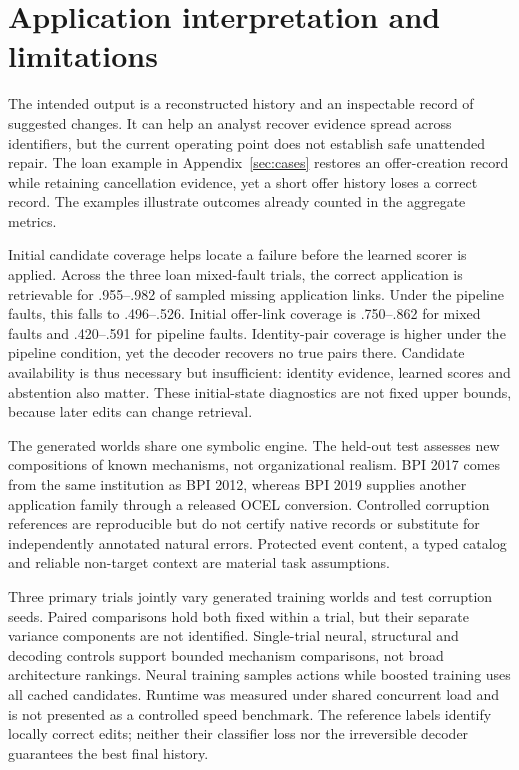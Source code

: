 \documentclass[11pt]{article}
\begin{document}
\section{Application interpretation and limitations}
The intended output is a reconstructed history and an inspectable record of suggested changes. It can help an analyst recover evidence spread across identifiers, but the current operating point does not establish safe unattended repair. The loan example in Appendix~\ref{sec:cases} restores an offer-creation record while retaining cancellation evidence, yet a short offer history loses a correct record. The examples illustrate outcomes already counted in the aggregate metrics.

Initial candidate coverage helps locate a failure before the learned scorer is applied. Across the three loan mixed-fault trials, the correct application is retrievable for .955--.982 of sampled missing application links. Under the pipeline faults, this falls to .496--.526. Initial offer-link coverage is .750--.862 for mixed faults and .420--.591 for pipeline faults. Identity-pair coverage is higher under the pipeline condition, yet the decoder recovers no true pairs there. Candidate availability is thus necessary but insufficient: identity evidence, learned scores and abstention also matter. These initial-state diagnostics are not fixed upper bounds, because later edits can change retrieval.

The generated worlds share one symbolic engine. The held-out test assesses new compositions of known mechanisms, not organizational realism. BPI 2017 comes from the same institution as BPI 2012, whereas BPI 2019 supplies another application family through a released OCEL conversion. Controlled corruption references are reproducible but do not certify native records or substitute for independently annotated natural errors. Protected event content, a typed catalog and reliable non-target context are material task assumptions.

Three primary trials jointly vary generated training worlds and test corruption seeds. Paired comparisons hold both fixed within a trial, but their separate variance components are not identified. Single-trial neural, structural and decoding controls support bounded mechanism comparisons, not broad architecture rankings. Neural training samples actions while boosted training uses all cached candidates. Runtime was measured under shared concurrent load and is not presented as a controlled speed benchmark. The reference labels identify locally correct edits; neither their classifier loss nor the irreversible decoder guarantees the best final history.
\end{document}

